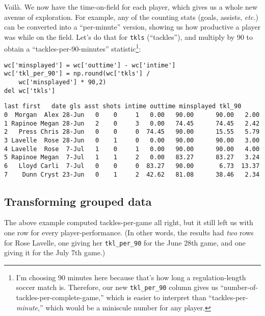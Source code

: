 
Voil\`{a}. We now have the time-on-field for each player, which gives us a
whole new avenue of exploration. For example, any of the counting stats (goals,
assists, \textit{etc.}) can be converted into a ``per-minute'' version, showing
us how productive a player was while on the field. Let's do that for
\texttt{tkls} (``tackles''), and multiply by 90 to obtain a ``tackles-per-90-minutes''
statistic\footnote{I'm choosing 90 minutes here because that's how long a
regulation-length soccer match is. Therefore, our new \texttt{tkl\_per\_90}
column gives us ``number-of-tackles-per-complete-game,'' which is easier to
interpret than ``tackles-per-\textit{minute},'' which would be a miniscule
number for any player.}:

\begin{Verbatim}[fontsize=\small,samepage=true,frame=single,framesep=3mm]
wc['minsplayed'] = wc['outtime'] - wc['intime']
wc['tkl_per_90'] = np.round(wc['tkls'] /
    wc['minsplayed'] * 90,2)
del wc['tkls']
\end{Verbatim}
\vspace{-.2in}

\begin{Verbatim}[fontsize=\scriptsize,samepage=true,frame=leftline,framesep=5mm,framerule=1mm]
     last first   date gls asst shots intime outtime minsplayed tkl_90
0  Morgan  Alex 28-Jun   0    0     1   0.00   90.00      90.00   2.00
1 Rapinoe Megan 28-Jun   2    0     3   0.00   74.45      74.45   2.42
2   Press Chris 28-Jun   0    0     0  74.45   90.00      15.55   5.79
3 Lavelle  Rose 28-Jun   0    1     0   0.00   90.00      90.00   3.00
4 Lavelle  Rose  7-Jul   1    0     1   0.00   90.00      90.00   4.00
5 Rapinoe Megan  7-Jul   1    1     2   0.00   83.27      83.27   3.24
6   Lloyd Carli  7-Jul   0    0     0  83.27   90.00       6.73  13.37
7    Dunn Cryst 23-Jun   0    1     2  42.62   81.08      38.46   2.34
\end{Verbatim}

\subsection{Transforming grouped data}

The above example computed tackles-per-game all right, but it still left us
with one row for every player-performance. (In other words, the results had
\textit{two} rows for Rose Lavelle, one giving her \texttt{tkl\_per\_90} for
the June 28th game, and one giving it for the July 7th game.)

